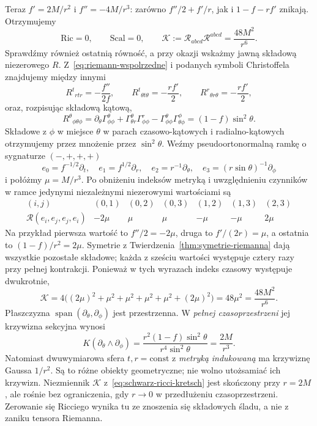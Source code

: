 \begin{przyklad}
Teraz $f'=2M/r^2$ i $f''=-4M/r^3$:
zarówno $f''/2+f'/r$, jak i $1-f-rf'$ znikają.
Otrzymujemy
\begin{equation}\label{eq:schwarz-ricci-kretsch}
 \mathrm{Ric}=0,\qquad \mathrm{Scal}=0,
 \qquad \mathcal K:={\mathcal R}_{abcd}
                   {\mathcal R}^{abcd}=\frac{48M^2}{r^6}.
\end{equation}
Sprawdźmy również ostatnią równość, a przy okazji
wskażmy jawną składową niezerowego $R$.
Z~\eqref{eq:riemann-wspolrzedne} i podanych symboli
Christoffela znajdujemy między innymi
\[
 R^t{}_{rtr}=-\frac{f''}{2f},\qquad
 R^t{}_{\theta t\theta}=-\frac{rf'}2,\qquad
 R^r{}_{\theta r\theta}=-\frac{rf'}2,
\]
oraz, rozpisując składową kątową,
\[
 R^\theta{}_{\phi\theta\phi}
 =\partial_\theta\Gamma^\theta_{\phi\phi}
   +\Gamma^\theta_{\theta r}\Gamma^r_{\phi\phi}
   -\Gamma^\theta_{\phi\phi}
          \Gamma^\phi_{\theta\phi}
 =(1-f)\sin^2\theta.
\]
Składowe z $\phi$ w miejsce $\theta$ w parach
czasowo-kątowych i radialno-kątowych otrzymujemy
przez mnożenie przez $\sin^2\theta$. Weźmy
pseudoortonormalną ramkę o sygnaturze $(-,+,+,+)$
\[
 e_0=f^{-1/2}\partial_t,\quad
 e_1=f^{1/2}\partial_r,\quad
 e_2=r^{-1}\partial_\theta,\quad
 e_3=(r\sin\theta)^{-1}\partial_\phi
\]
i połóżmy $\mu=M/r^3$. Po obniżeniu indeksów
metryką i uwzględnieniu czynników w ramce
jedynymi niezależnymi niezerowymi wartościami są
\[
 \begin{array}{c|rrrrrr}
 (i,j)&(0,1)&(0,2)&(0,3)&(1,2)&(1,3)&(2,3)\\ \hline
 \mathcal R(e_i,e_j,e_j,e_i)
       &-2\mu&\mu&\mu&-\mu&-\mu&2\mu
 \end{array}
\]
Na przykład pierwsza wartość to $f''/2=-2\mu$,
druga to $f'/(2r)=\mu$, a ostatnia to
$(1-f)/r^2=2\mu$. Symetrie z
Twierdzenia~\ref{thm:symetrie-riemanna} dają
wszystkie pozostałe składowe; każda z sześciu
wartości występuje cztery razy przy pełnej
kontrakcji. Ponieważ w tych wyrazach indeks
czasowy występuje dwukrotnie,
\[
 \mathcal K=4\bigl((2\mu)^2+\mu^2+\mu^2
                     +\mu^2+\mu^2+(2\mu)^2\bigr)
           =48\mu^2=\frac{48M^2}{r^6}.
\]
Płaszczyzna $\operatorname{span}(\partial_\theta,
\partial_\phi)$ jest przestrzenna. W \emph{pełnej
czasoprzestrzeni} jej krzywizna sekcyjna wynosi
\begin{equation}\label{eq:schwarz-k-sekcyjna-katowa}
 K(\partial_\theta\wedge\partial_\phi)
 =\frac{r^2(1-f)\sin^2\theta}{r^4\sin^2\theta}
 =\frac{2M}{r^3}.
\end{equation}
Natomiast dwuwymiarowa sfera $t,r=\mathrm{const}$
z \emph{metryką indukowaną} ma krzywiznę Gaussa
$1/r^2$. Są to różne obiekty geometryczne;
nie wolno utożsamiać ich krzywizn. Niezmiennik
$\mathcal K$ z~\eqref{eq:schwarz-ricci-kretsch}
jest skończony przy $r=2M$, ale rośnie bez
ograniczenia, gdy $r\to0$ w przedłużeniu
czasoprzestrzeni. Zerowanie się Ricciego wynika
tu ze znoszenia się składowych śladu, a nie z
zaniku tensora Riemanna.
\end{przyklad}

